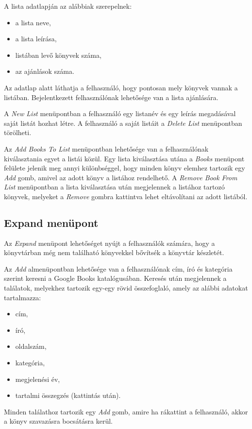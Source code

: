 \noindent A lista adatlapján az alábbiak szerepelnek:
\begin{itemize}
    \item a lista neve,
    \item a lista leírása,
    \item listában levő könyvek száma,
    \item az ajánlások száma.
\end{itemize}

Az adatlap alatt láthatja a felhasználó, hogy pontosan mely könyvek vannak a listában. Bejelentkezett felhasználónak lehetősége van a lista ajánlására.

A \textit{New List} menüpontban a felhasználó egy listanév és egy leírás megadásával saját listát hozhat létre. A felhasználó a saját listáit a \textit{Delete List} menüpontban törölheti.

Az \textit{Add Books To List} menüpontban lehetősége van a felhasználónak kiválasztania egyet a listái közül. Egy lista kiválasztása utána a \textit{Books} menüpont felülete jelenik meg annyi különbséggel, hogy minden könyv elemhez tartozik egy \textit{Add} gomb, amivel az adott könyv a listához rendelhető. A \textit{Remove Book From List} menüpontban a lista kiválasztása után megjelennek a listához tartozó könyvek, melyeket a \textit{Remove} gombra kattintva lehet eltávolítani az adott listából.

\subsection{Expand menüpont}

Az \textit{Expand} menüpont lehetőséget nyújt a felhasználók számára, hogy a könyvtárban még nem található könyvekkel bővítsék a könyvtár készletét. 

Az \textit{Add} almenüpontban lehetősége van a felhasználónak cím, író és kategória szerint keresni a Google Books katalógusában. Keresés után megjelennek a találatok, melyekhez tartozik egy-egy rövid összefoglaló, amely az alábbi adatokat tartalmazza:
\begin{itemize}
    \item cím,
    \item író,
    \item oldalszám,
    \item kategória,
    \item megjelenési év,
    \item tartalmi összegzés (kattintás után).
\end{itemize}
Minden találathoz tartozik egy \textit{Add} gomb, amire ha rákattint a felhasználó, akkor a könyv szavazásra bocsátásra kerül.

